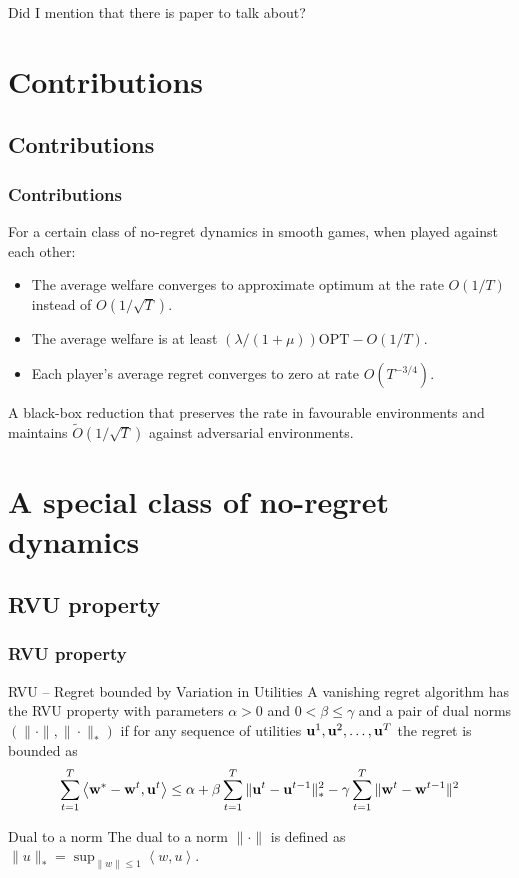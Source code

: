 \documentclass{beamer}
\renewcommand{\vec}[1]{\ensuremath{{\bf #1}}}
\newcommand{\dotp}[2]{\ensuremath{\left\langle #1, #2 \right\rangle}}
\begin{document}
\begin{frame}[c]
	\begin{center}
		\Huge Did I mention that there is paper to talk about?
	\end{center}
\end{frame}


\section{Contributions}
\subsection{Contributions}
\begin{frame}
	\frametitle{Contributions}
	For a certain class of no-regret dynamics in smooth games, when played against each other:
	\begin{itemize}
		\item\alert<3>{ The average welfare converges to approximate optimum at the rate $O(1/T)$ instead of $O(1/\sqrt{T})$.}
		\item The average welfare is at least $ (\lambda / (1 + \mu)) \text{OPT} - O(1/T) $.
		\item Each player's average regret converges to zero at rate $O(T^{-3/4})$.
	\end{itemize}\pause
	A black-box reduction that preserves the rate in favourable environments and maintains $\tilde{O}(1/\sqrt{T})$ against adversarial environments.
\end{frame}




\section[A class of no-regret dynamics]{A special class of no-regret dynamics}
\subsection{RVU property}

\begin{frame}
	\frametitle{RVU property}
	\begin{block}{RVU -- Regret bounded by Variation in Utilities}
		A vanishing regret algorithm has the RVU property with parameters $\alpha>0$ and $0<\beta\leq\gamma$ and a pair of dual norms $(\|\cdot\|, \|\cdot\|_*)$ if for any sequence of utilities $\vec{u}^1, \vec{u}^2, \ldots, \vec{u}^T$ the regret is bounded as 
		\begin{equation*}
		\sum_{t=1}^{T} \dotp{\vec{w}^*- \vec{w}^t}{\vec{u}^t} \leq \alpha
		+\beta \sum_{t=1}^{T} \| \vec{u}^t - \vec{u}^{t-1}\|_*^2 -
		\gamma\sum_{t=1}^{T} \|\vec{w}^{t} - \vec{w}^{t-1}\|^2
		\end{equation*}  
	\end{block}
	
	\begin{block}{Dual to a norm}
		The dual to a norm
		$\|\cdot\|$ is defined as $\|u\|_* = \sup_{\|w\| \leq 1}
		\dotp{w}{u}$.
	\end{block}
\end{frame}
\end{document}
